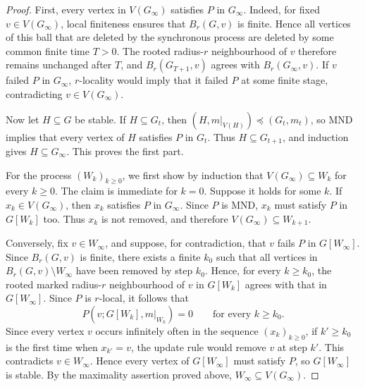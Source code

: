 \documentclass[11pt]{article}
\theoremstyle{plain}
\begin{document}
\begin{proof} First, every vertex in $V(G_\infty)$ satisfies $P$ in $G_\infty$. Indeed,
for fixed $v\in V(G_\infty)$, local finiteness ensures that $B_r(G,v)$ is finite. Hence
all vertices of this ball that are deleted by the synchronous process are
deleted by some common finite time $T>0$. The rooted radius-$r$ neighbourhood of
$v$ therefore remains unchanged after $T$, and $B_r(G_{T+1},v)$ agrees with $B_r(G_\infty,v)$. 
If
$v$ failed $P$ in $G_\infty$, $r$-locality would imply that it failed $P$ at
some finite stage, contradicting $v\in V(G_\infty)$.

Now let $H\subseteq G$ be stable.  If $H\subseteq G_t$, then \((H,m|_{V(H)})\preceq(G_t,m_t)\), so MND implies that every vertex of $H$ satisfies $P$ in
$G_t$. Thus $H\subseteq G_{t+1}$, and induction gives $H\subseteq G_\infty$.
This proves the first part.

For the process $(W_k)_{k\ge0}$, we first show by
induction that $V(G_\infty)\subseteq W_k$ for every $k\ge0.$ 
The claim is immediate for \(k=0\). Suppose it holds for some \(k\).
If 
\(x_k\in V(G_\infty)\), then \(x_k\) satisfies \(P\) in \(G_\infty\).
Since $P$ is MND, $x_k$ must satisfy $P$ in $G[W_k]$ too. 
Thus \(x_k\) is not removed, and therefore
\(V(G_\infty)\subseteq W_{k+1}\).

Conversely, fix $v\in W_\infty$, and suppose, for contradiction, that $v$ fails $P$ in
$G[W_\infty]$.
Since $B_r(G,v)$ is finite, there exists a finite $k_0$ such that
all vertices in $B_r(G,v)\setminus W_\infty$ have been removed by
step $k_0$. Hence, for every $k\ge k_0$, the rooted marked
radius-$r$ neighbourhood of $v$ in $G[W_k]$ agrees with that in
$G[W_\infty]$.  Since $P$ is $r$-local, it follows that
\[
P(v;G[W_k],m|_{W_k})=0
\qquad\text{for every } k\ge k_0.
\]
Since every vertex $v$ occurs infinitely often in the sequence
$(x_k)_{k\ge0}$, if $k' \geq k_0$ is the first time when $x_{k'}=v$, the update rule
would remove $v$ at step $k'$. This contradicts $v\in W_\infty$. Hence every vertex of $G[W_\infty]$ must satisfy $P$, so
$G[W_\infty]$ is stable. By the maximality assertion proved above,
$W_\infty\subseteq V(G_\infty)$.
\end{proof}
\end{document}
